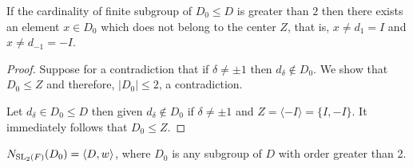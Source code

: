 \begin{lemma}
    \label{ex_of_card_D_gt_two}
    \leanok
    If the cardinality of finite subgroup of $D_0 \le D$ is greater than $2$ then there exists an element $x \in D_0$ which does not belong to the center $Z$, that is, $x \ne d_1 = I$ and $x \ne d_{-1} = -I$.
\end{lemma}
\begin{proof}
    \leanok
 Suppose for a contradiction that if $\delta \ne \pm 1$ then $d_\delta \notin D_0$. We show that $D_0 \le Z$ and therefore, $|D_0| \le 2$, a contradiction.
 
 Let $d_\delta \in D_0 \le D$ then given $d_\delta \notin D_0$ if $\delta \ne \pm 1$ and $Z = \langle -I\rangle = \{I, -I\}$. It immediately follows that $D_0 \le Z$.

\end{proof}


\begin{proposition}
\label{normalizer_subgroup_D_eq_DW}
\leanok
    $N_{\operatorname{SL}_2(F)}(D_0) = \langle D , w \rangle$, where  $D_0$ is any subgroup of $D$ with order greater than 2. \\
    \end{proposition}

